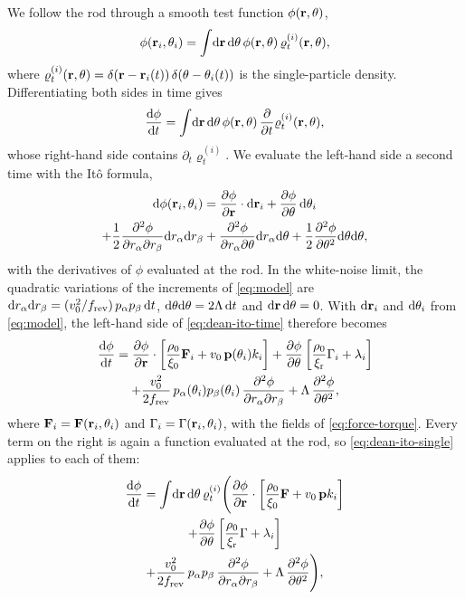 \documentclass[aps,pre,reprint,superscriptaddress,longbibliography,nofootinbib
]{revtex4-2}
\begin{document}
We follow the rod through a smooth test function
$\phi(\mathbf{r},\theta)$,
\begin{equation}
  \label{eq:dean-ito-single}
  \phi(\mathbf{r}_i,\theta_i)=\int\!\mathrm{d}\mathbf{r}\,\mathrm{d}\theta\,\phi(\mathbf{r},\theta)\,\varrho^{(i)}_t(\mathbf{r},\theta),
\end{equation}
where $\varrho^{(i)}_t(\mathbf{r},\theta) =
\delta(\mathbf{r}-\mathbf{r}_i(t))\,\delta(\theta-\theta_i(t))$ is the
single-particle density. Differentiating both sides in time
gives
\begin{equation}
  \label{eq:dean-ito-time}
  \frac{\mathrm{d}\phi}{\mathrm{d} t} = \int\!\mathrm{d}\mathbf{r}\,\mathrm{d}\theta\,\phi(\mathbf{r},\theta)\,\frac{\partial }{\partial t}\varrho^{(i)}_t(\mathbf{r},\theta),
\end{equation}
whose right-hand side contains $\partial_t\varrho^{(i)}_t$.
We evaluate the left-hand side a second time with the It\^o
formula,
\begin{multline}
  \label{eq:dean-ito}
  \mathrm{d}\phi(\mathbf{r}_i,\theta_i) = \frac{\partial \phi}{\partial \mathbf{r}}\cdot\mathrm{d}\mathbf{r}_i + \frac{\partial \phi}{\partial \theta}\,\mathrm{d}\theta_i
  \\
  + \frac12\frac{\partial ^2\phi}{\partial r_\alpha\partial r_\beta}\mathrm{d} r_\alpha \mathrm{d} r_\beta
  + \frac{\partial ^2\phi}{\partial r_\alpha\partial \theta}\mathrm{d} r_\alpha \mathrm{d} \theta
  + \frac12\frac{\partial ^2\phi}{\partial \theta^2}\mathrm{d} \theta \mathrm{d}\theta,
\end{multline}
with the derivatives of $\phi$ evaluated at the rod. In the
white-noise limit, the quadratic variations of the
increments of \cref{eq:model} are $\mathrm{d} r_\alpha\mathrm{d}
r_\beta=(v_0^2/f_{\rm rev})\,p_\alpha p_\beta\,\mathrm{d} t$, $\mathrm{d} \theta
\mathrm{d}\theta=2\Lambda\,\mathrm{d} t$ and $\mathrm{d}\mathbf{r}\,\mathrm{d}\theta=0$. With
$\mathrm{d}\mathbf{r}_i$ and $\mathrm{d}\theta_i$ from \cref{eq:model}, the
left-hand side of \cref{eq:dean-ito-time} therefore becomes
\begin{multline}
  \frac{\mathrm{d}\phi}{\mathrm{d} t} = \frac{\partial \phi}{\partial \mathbf{r}}\cdot\left[
    \frac{\rho_0}{\xi_0}\mathbf{F}_i + v_0\,\mathbf{p}(\theta_i) k_i
  \right]
  + \frac{\partial \phi}{\partial \theta}\left[
    \frac{\rho_0}{\xi_{\rm r}}\Gamma_i + \lambda_i
  \right]
  \\
  + \frac{v_0^2}{2f_{\rm rev}}\,p_\alpha(\theta_i) p_\beta(\theta_i)\,\frac{\partial ^2\phi}{\partial r_\alpha\partial r_\beta}
  + \Lambda\,\frac{\partial ^2\phi}{\partial \theta^2},
\end{multline}
where $\mathbf{F}_i = \mathbf{F}(\mathbf{r}_i,\theta_i)$ and $\Gamma_i =
\Gamma(\mathbf{r}_i,\theta_i)$, with the fields of
\cref{eq:force-torque}. Every term on the right is again a
function evaluated at the rod, so \cref{eq:dean-ito-single}
applies to each of them:
\begin{multline}
\frac{\mathrm{d}\phi}{\mathrm{d} t} = \int\!\mathrm{d}\mathbf{r}\,\mathrm{d}\theta\,\varrho^{(i)}_t
\Bigg(\frac{\partial \phi}{\partial \mathbf{r}}\cdot\left[
    \frac{\rho_0}{\xi_0}\mathbf{F} + v_0\,\mathbf{p} k_i
  \right]
  \\
  + \frac{\partial \phi}{\partial \theta}\left[
    \frac{\rho_0}{\xi_{\rm r}}\Gamma + \lambda_i
  \right]
  \\
 + \frac{v_0^2}{2f_{\rm rev}}\,p_\alpha p_\beta\,\frac{\partial ^2\phi}{\partial r_\alpha\partial r_\beta}
  + \Lambda\,\frac{\partial ^2\phi}{\partial \theta^2}
\Bigg),
\end{multline}
\end{document}
